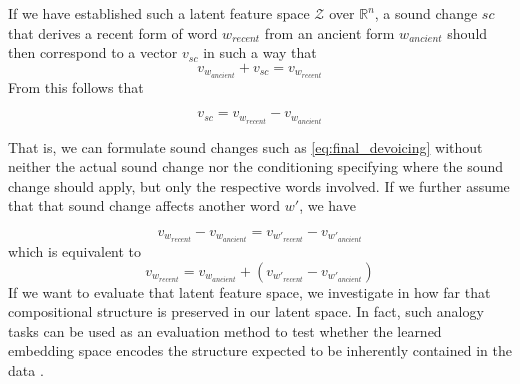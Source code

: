\documentclass[8pt]{article}
\begin{document}
If we have established such a latent feature space $\mathcal{Z}$ over $\mathbb{R}^n$, a sound change $sc$ that derives a recent form of word $w_{recent}$ from an ancient form  $w_{ancient}$ should then correspond to a vector $v_{sc}$ in such a way that 
\begin{equation}
\label{eq:sound_change_linear_dependency}
v_{w_{ancient}}+v_{sc} = v_{w_{recent}}
\end{equation}
From this follows that 

\begin{equation}
v_{sc} =  v_{w_{recent}} - v_{w_{ancient}} 
\end{equation}

That is, we can formulate sound changes such as \ref{eq:final_devoicing} without neither the actual sound change nor the conditioning specifying where the sound change should apply, but only the respective words involved.
If we further assume that that sound change affects another word $w'$, we have

\begin{equation}
v_{w_{recent}} - v_{w_{ancient}}  =  v_{w'_{recent}} - v_{w'_{ancient}} 
\end{equation}
which is equivalent to
\begin{equation}
v_{w_{recent}}  =   v_{w_{ancient}}  + (v_{w'_{recent}} - v_{w'_{ancient}}) 
\end{equation}
If we want to evaluate that latent feature space, we investigate in how far that compositional structure is preserved in our latent space. In fact, such analogy tasks can be used as an evaluation method to test whether the learned embedding space encodes the structure expected to be inherently contained in the data \cite{mikolov2013distributed}.
\end{document}
